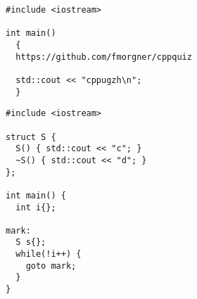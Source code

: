 \begin{frame}[fragile]
  \begin{lstlisting}[commentstyle=\color{black}]
#include <iostream>

int main()
  {
  https://github.com/fmorgner/cppquiz

  std::cout << "cppugzh\n";
  }
  \end{lstlisting}
\end{frame}
\begin{frame}[fragile]
  \begin{lstlisting}[commentstyle=\color{black}]
#include <iostream>

struct S {
  S() { std::cout << "c"; }
  ~S() { std::cout << "d"; }
};

int main() {
  int i{};

mark:
  S s{};
  while(!i++) {
    goto mark;
  }
}
  \end{lstlisting}
\end{frame}
